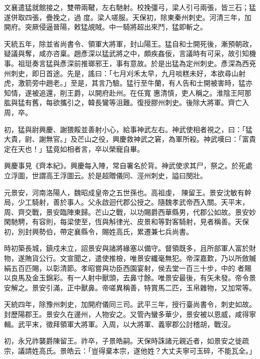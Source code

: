 \begin{pinyinscope}
 文襄遣猛就館接之，雙帶兩鞬，左右馳射。校挽彊弓，梁人引弓兩張，皆三石；猛遂併取四張，疊挽之，過
 度。梁人嗟服。天保初，除東秦州刺史。河清三年，加開府。突厥侵逼晉陽，敕猛覘賊。中一騎將超出來鬥，猛即斬之。



 天統五年，除並省尚書令、領軍大將軍，封山陽王。猛自和士開死後，漸預朝政，疑議與奪，咸亦咨稟。趙彥深以猛武將之中，頗疾姦佞，言議時有可采，故引知機事。祖珽奏言猛與彥深前推瑯邪王，事有意故。於是出猛為定州刺史。彥深為西兗州刺史，即日首途。先是，謠曰：「七月刈禾太早，九月啖糕未好，本欲尋山射虎，激箭旁中趙老。」至是，其言乃驗。猛行至牛蘭，有人告和士開被害時，猛亦知情，遂被追還，削王爵，以開府赴州。在任寬
 惠清慎，吏人稱之。淮陰王阿那肱與猛有舊，每欲攜引之，韓長鸞等沮難。復授膠州刺史。後除大將軍。齊亡入周，卒。



 初，猛與尉興慶、謝猥餒並善射小心，給事神武左右。神武使相者視之，曰：「猛大貴，尉、謝無官。」及芒山之役，興慶救神武之窘，為軍所殺。神武嘆曰：「富貴定在天也！」猛竟如相者言，卒以榮寵自畢。



 興慶事見《齊本紀》。興慶每入陣，常自署名於背。神武使求其尸，祭之。於死處立浮圖，世謂高王浮圖云。於是超贈儀同、涇州刺史，謚曰閔壯。



 元景安，河南洛陽人，魏昭成皇帝之五世孫也。高祖虔，
 陳留王。景安沈敏有幹局，少工騎射，善於事人。父永啟迴代郡公授之。隨魏孝武帝西入關。天平末，周、齊交戰，景安臨陣東歸。芒山之戰，以功賜爵西華縣男，代郡公如故。景安妙閑馳騁，有容則，每梁使至，恆與斛律光、皮景和等對客騎射，見者稱善。天保初，別封興勢伯，帶定襄縣令，賜姓高氏，累遷兼七兵尚書。



 時初築長城，鎮戍未立，詔景安與諸將緣塞以備守。督領既多，且所部軍人富於財物，遂賄貨公行。文宣聞之，遣使推檢，唯景安纖毫無犯。帝深嘉歎，乃以所斂贓絹五百匹賜，以彰清節。孝昭嘗與功臣西園宴射，侯去堂一百三十步，中的
 者賜以良馬及金玉錦彩。有一人射中獸頭，去鼻寸餘。唯景安最後，有矢未發。帝令景安解之。景安引滿，正中獸鼻。帝嗟異稱善，特賞馬二匹，玉帛雜物，又加常等。



 天統四年，除豫州刺史，加開府儀同三司。武平三年，授行臺尚書令，刺史如故。封歷陽郡王。景安久在邊州，人物安之。又管內蠻多華少，景安被以恩威，咸得寧輯。武平末，徵拜領軍大將軍。入周，以大將軍、義寧郡公討稽胡，戰沒。



 初，永兄祚襲爵陳留王。祚卒，子景皓嗣。天保時誅諸元親近者，如景安之徙疏宗，議請姓高氏。景皓云：「豈得棄本宗，遂他姓？大丈夫寧可玉碎，不能瓦全。」




\end{pinyinscope}
